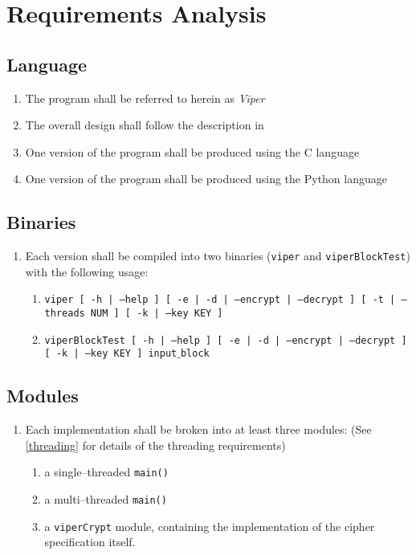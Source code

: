 \section{Requirements Analysis}

\subsection{Language}
\begin{enumerate}
\item The program shall be referred to herein as \emph{Viper}
\item The overall design shall follow the description in \cite{submission}
\item One version of the program shall be produced using the C language
\item One version of the program shall be produced using the Python language
\end{enumerate}

\subsection{Binaries}
\begin{enumerate}
\item Each version shall be compiled into two binaries (\texttt{viper} and \texttt{viperBlockTest}) with the following usage:
	\begin{enumerate}
	\item \texttt{viper [ -h | --help ]  [ -e | -d | --encrypt | --decrypt ] [ -t | --threads NUM ] [ -k | --key KEY ]}
	\item \texttt{viperBlockTest [ -h | --help ]  [ -e | -d | --encrypt | --decrypt ] [ -k | --key KEY ] input$\_$block}
	\end{enumerate}
\end{enumerate}

\subsection{Modules}
\begin{enumerate}
\item Each implementation shall be broken into at least three modules: (See \ref{threading} for details of the threading requirements)
	\begin{enumerate}
	\item a single--threaded \texttt{main()}
	\item a multi--threaded \texttt{main()}
	\item a \texttt{viperCrypt} module, containing the implementation of the cipher specification itself.
	\end{enumerate}
\end{enumerate}

